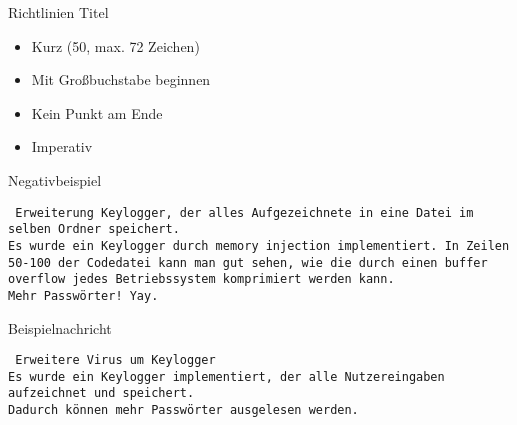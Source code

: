 \begin{frame}{Richtlinien Titel}
\begin{itemize}
\item<2-> Kurz (50, max. 72 Zeichen)
\item<3-> Mit Großbuchstabe beginnen
\item<4-> Kein Punkt am Ende
\item<5-> Imperativ
\end{itemize}
\end{frame}

\begin{frame}{Negativbeispiel}
\footnotesize

\texttt{\noindent
Erweiterung Keylogger, der alles Aufgezeichnete in eine Datei im selben Ordner speichert.\bigskip\\
Es wurde ein Keylogger durch memory injection implementiert. In Zeilen 50-100 der Codedatei kann man gut sehen, wie die durch einen buffer overflow jedes Betriebssystem komprimiert werden kann.\\
Mehr Passwörter! Yay.
}
\end{frame}

\begin{frame}{Beispielnachricht}
\footnotesize

\texttt{\noindent
Erweitere Virus um Keylogger\bigskip\\
Es wurde ein Keylogger implementiert, der alle 
Nutzereingaben aufzeichnet und speichert.\\
Dadurch können mehr Passwörter ausgelesen werden.
}
\end{frame}



